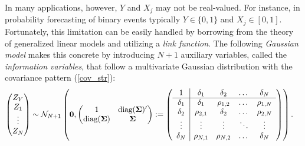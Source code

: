 \documentclass[11pt]{article}
\newcommand{\E}{\mathbb{E}}
\theoremstyle{definition}
\theoremstyle{definition}
\def\bSigma{{\bf \Sigma}}
\def\E{{\mathbb E}}
\def\diag{\text{diag}}
\def\diag{\text{diag}}
\begin{document}
In many applications, however, $Y$ and $X_j$ may not be real-valued. For instance, in probability forecasting of binary events typically  $Y \in \{0,1\}$ and $X_j \in [0,1]$. Fortunately, this limitation can be easily handled by borrowing from the theory of generalized linear models \citep{mccullagh1989generalized} and utilizing a \textit{link function}. The following \textit{Gaussian model} makes this concrete by introducing $N+1$ auxiliary variables, called the \textit{information variables}, that follow a multivariate Gaussian distribution with the covariance pattern (\ref{cov_str}):
\begin{align}
\left(\begin{matrix} Z_Y \\ Z_{1}\\ \vdots \\ Z_{N} \end{matrix}\right) &\sim \mathcal{N}_{N+1}\left( 
 \boldsymbol{0}, \left(\begin{matrix} 
1 & \diag(\bSigma)'\\
\diag(\bSigma) &\bSigma\\
 \end{matrix}\right) 
 :=
 \left(\begin{array}{c | c c cc }
1 & \delta_1 & \delta_2 & \dots & \delta_N  \\ \hline
\delta_1 & \delta_1 &\rho_{1,2} & \dots & \rho_{1,N}   \\ 
\delta_2 & \rho_{2,1} & \delta_2 & \dots & \rho_{2,N}  \\ 
\vdots & \vdots & \vdots & \ddots & \vdots  \\ 
\delta_N & \rho_{N,1} & \rho_{N,2} & \dots & \delta_N\\ 
 \end{array}\right)\right).  \label{NExperts}
\end{align}
\end{document}

